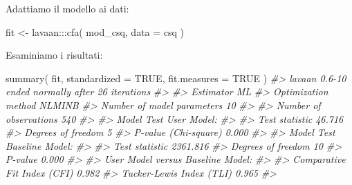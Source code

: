\documentclass[
  11pt,
]{krantz}
\makeatletter
\newenvironment{Shaded}{\begin{snugshade}}{\end{snugshade}}
\newcommand{\AttributeTok}[1]{\textcolor[rgb]{0.61,0.61,0.61}{#1}}
\newcommand{\CommentTok}[1]{\textcolor[rgb]{0.37,0.37,0.37}{\textit{#1}}}
\newcommand{\ConstantTok}[1]{\textcolor[rgb]{0,0,0}{#1}}
\newcommand{\FunctionTok}[1]{\textcolor[rgb]{0,0,0}{#1}}
\newcommand{\NormalTok}[1]{#1}
\newcommand{\OtherTok}[1]{\textcolor[rgb]{0.37,0.37,0.37}{#1}}
\newcommand{\SpecialCharTok}[1]{\textcolor[rgb]{0,0,0}{#1}}
\newenvironment{kframe}{%
\medskip{}
\setlength{\fboxsep}{.8em}
 \def\at@end@of@kframe{}%
 \ifinner\ifhmode%
  \def\at@end@of@kframe{\end{minipage}}%
  \begin{minipage}{\columnwidth}%
 \fi\fi%
 \def\FrameCommand##1{\hskip\@totalleftmargin \hskip-\fboxsep
 \colorbox{shadecolor}{##1}\hskip-\fboxsep
     \hskip-\linewidth \hskip-\@totalleftmargin \hskip\columnwidth}%
 \MakeFramed {\advance\hsize-\width
   \@totalleftmargin\z@ \linewidth\hsize
   \@setminipage}}%
 {\par\unskip\endMakeFramed%
 \at@end@of@kframe}
\renewenvironment{Shaded}{\begin{kframe}}{\end{kframe}}
\theoremstyle{definition}
\theoremstyle{definition}
\theoremstyle{definition}
\theoremstyle{definition}
\theoremstyle{remark}
\makeatother
\begin{document}
Adattiamo il modello ai dati:

\begin{Shaded}
\begin{Highlighting}[]
\NormalTok{fit }\OtherTok{\textless{}{-}}\NormalTok{ lavaan}\SpecialCharTok{:::}\FunctionTok{cfa}\NormalTok{(}
\NormalTok{  mod\_csq,}
  \AttributeTok{data =}\NormalTok{ csq}
\NormalTok{)}
\end{Highlighting}
\end{Shaded}

Esaminiamo i risultati:

\begin{Shaded}
\begin{Highlighting}[]
\FunctionTok{summary}\NormalTok{(}
\NormalTok{  fit,}
  \AttributeTok{standardized =} \ConstantTok{TRUE}\NormalTok{,}
  \AttributeTok{fit.measures =} \ConstantTok{TRUE}
\NormalTok{)}
\CommentTok{\#\textgreater{} lavaan 0.6{-}10 ended normally after 26 iterations}
\CommentTok{\#\textgreater{} }
\CommentTok{\#\textgreater{}   Estimator                                         ML}
\CommentTok{\#\textgreater{}   Optimization method                           NLMINB}
\CommentTok{\#\textgreater{}   Number of model parameters                        10}
\CommentTok{\#\textgreater{}                                                       }
\CommentTok{\#\textgreater{}   Number of observations                           540}
\CommentTok{\#\textgreater{}                                                       }
\CommentTok{\#\textgreater{} Model Test User Model:}
\CommentTok{\#\textgreater{}                                                       }
\CommentTok{\#\textgreater{}   Test statistic                                46.716}
\CommentTok{\#\textgreater{}   Degrees of freedom                                 5}
\CommentTok{\#\textgreater{}   P{-}value (Chi{-}square)                           0.000}
\CommentTok{\#\textgreater{} }
\CommentTok{\#\textgreater{} Model Test Baseline Model:}
\CommentTok{\#\textgreater{} }
\CommentTok{\#\textgreater{}   Test statistic                              2361.816}
\CommentTok{\#\textgreater{}   Degrees of freedom                                10}
\CommentTok{\#\textgreater{}   P{-}value                                        0.000}
\CommentTok{\#\textgreater{} }
\CommentTok{\#\textgreater{} User Model versus Baseline Model:}
\CommentTok{\#\textgreater{} }
\CommentTok{\#\textgreater{}   Comparative Fit Index (CFI)                    0.982}
\CommentTok{\#\textgreater{}   Tucker{-}Lewis Index (TLI)                       0.965}
\CommentTok{\#\textgreater{} }

\end{Highlighting}
\end{Shaded}
\end{document}
